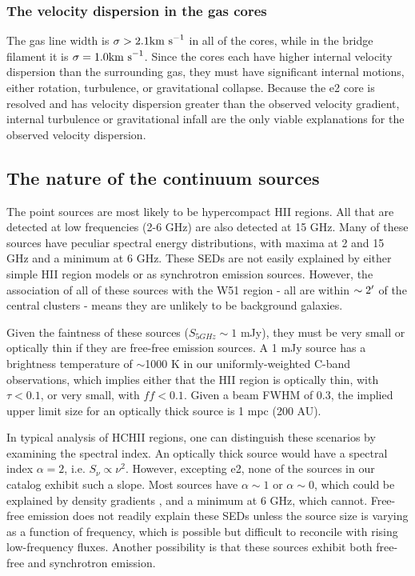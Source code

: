 \subsubsection{The velocity dispersion in the gas cores}
The gas line width is $\sigma>2.1\textrm{km~s}^{-1}$ in all of the cores, while in the bridge
filament it is $\sigma=1.0\textrm{km~s}^{-1}$.  Since the cores each have higher internal
velocity dispersion than the surrounding gas, they must have significant
internal motions, either rotation, turbulence, or gravitational collapse.
Because the e2 core is resolved and has velocity dispersion greater than the
observed velocity gradient, internal turbulence or gravitational infall are the
only viable explanations for the observed velocity dispersion.

\subsection{The nature of the continuum sources}
The point sources are most likely to be hypercompact HII regions.  All that
are detected at low frequencies (2-6 GHz) are also detected at 15 GHz.  Many of
these sources have peculiar spectral energy distributions, with maxima at 2 and
15 GHz and a minimum at 6 GHz.  These SEDs are not easily explained by either
simple HII region models or as synchrotron emission sources.  However, the
association of all of these sources with the W51 region - all are within
$\sim2\mbox{$^\prime$}$ of the central clusters - means they are unlikely to be
background galaxies.  

Given the faintness of these sources ($S_{5 GHz} \sim 1$ mJy), they must be
very small or optically thin if they are free-free emission sources.  A 1 mJy
source has a brightness temperature of $\sim$1000 K in our uniformly-weighted
C-band observations, which implies either that the HII region is optically
thin, with $\tau < 0.1$, or very small, with $ff<0.1$.  Given a beam FWHM of
0.3\arcsec, the implied upper limit size for an optically thick source is 1 mpc
(200 AU).

In typical analysis of HCHII regions, one can distinguish these scenarios by
examining the spectral index.  An optically thick source would have a spectral
index $\alpha=2$, i.e. $S_\nu \propto \nu^2$.  However, excepting e2, none of
the sources in our catalog exhibit such a slope.  Most sources have
$\alpha\sim1$ or $\alpha\sim0$, which could be explained by density gradients
\citep{Keto2008a,Galvan-Madrid2009a}, and a minimum at 6 GHz, which cannot.
Free-free emission does not readily explain these SEDs unless the source size
is varying as a function of frequency, which is possible but difficult to
reconcile with rising low-frequency fluxes.  Another possibility is that these
sources exhibit both free-free and synchrotron emission.

